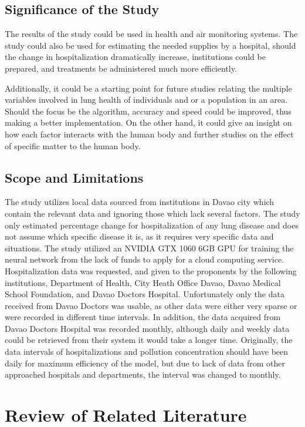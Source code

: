 \documentclass[10pt,11pt,12pt,oneside]{book}
\begin{document}
    \section{Significance of the Study}
    The results of the study could be used in health and air monitoring systems. The study could also be used for estimating the needed supplies by a hospital, should the change in hospitalization dramatically increase, institutions could be prepared, and treatments be administered much more efficiently.

    Additionally, it could be a starting point for future studies relating the multiple variables involved in lung health of individuals and or a population in an area. Should the focus be the algorithm, accuracy and speed could be improved, thus making a better implementation. On the other hand, it could give an insight on how each factor interacts with the human body and further studies on the effect of specific matter to the human body.
    \section{Scope and Limitations}
    The study utilizes local data sourced from institutions in Davao city which contain the relevant data and ignoring those which lack several factors. The study only estimated percentage change for hospitalization of any lung disease and does not assume which specific disease it is, as it requires very specific data and situations. The study utilized an NVIDIA GTX 1060 6GB GPU for training the neural network from the lack of funds to apply for a cloud computing service.\\

    Hospitalization data was requested, and given to the proponents by the following institutions, Department of Health, City Heath Office Davao, Davao Medical School Foundation, and Davao Doctors Hospital. Unfortunately only the data received from Davao Doctors was usable, as other data were either very sparse or were recorded in different time intervals. In addition, the data acquired from Davao Doctors Hospital was recorded monthly, although daily and weekly data could be retrieved from
their system it would take a longer time. Originally, the data intervals of hospitalizations and pollution concentration should have been daily for maximum efficiency of the model, but due to lack of data from other approached hospitals and departments, the interval was changed to monthly.
\chapter{Review of Related Literature}
\end{document}
